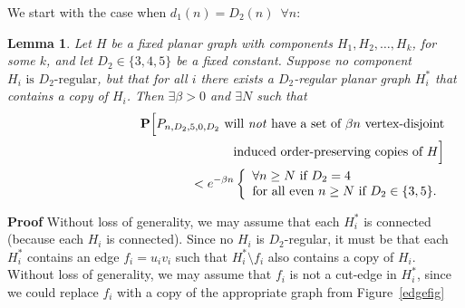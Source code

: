 \documentclass{article}
\newtheorem{Lemma}[Theorem]{Lemma}
\newtheorem{Proof of Theorem}{Proof of Theorem}
\begin{document}
We start with the case when $d_{1}(n)=D_{2}(n)$~$\forall n$:





\begin{Lemma} \label{bounded901}
Let $H$ be a fixed planar graph with components $H_{1}, H_{2}, \ldots, H_{k}$, for some $k$,
and let $D_{2} \in \{3,4,5 \}$ be a fixed constant.
Suppose no component $H_{i} \textrm{ is $D_{2}$-regular}$,
but that for all $i$ there exists a $D_{2}$-regular planar graph $H_{i}^{*}$ that contains a copy of $H_{i}$.
Then $\exists \beta > 0$ and $\exists N$ such that
\begin{eqnarray*}
& & \mathbf{P} \Big[
\textrm{$P_{n,D_{2},5,0,D_{2}}$
will \emph{not} have a set of $\beta n$ vertex-disjoint} \\
& & \phantom{wwwwwwwwwwq}\textrm{induced order-preserving copies of $H$}\Big] \\
& & \phantom{wwwwwwwwwwwwwwww}< e^{- \beta n} 
\left \{ \begin{array}{ll}
\forall n \geq N \textrm{ if } D_{2}=4 \\
\textrm{for all even } n \geq N \textrm{ if } D_{2} \in \{ 3,5 \}.
\end{array} \right.
\end{eqnarray*}
\end{Lemma}
\textbf{Proof}
Without loss of generality,
we may assume that each $H_{i}^{*}$ is connected
(because each $H_{i}$ is connected).
Since no $H_{i}$ is $D_{2}$-regular,
it must be that each~$H_{i}^{*}$ contains an edge $f_{i}=u_{i}v_{i}$
such that $H_{i}^{*} \setminus f_{i}$ also contains a copy of $H_{i}$.
Without loss of generality,
we may assume that $f_{i}$ is not a cut-edge in $H_{i}^{*}$,
since we could replace $f_{i}$ with a copy of the appropriate graph from Figure~\ref{edgefig}
\end{document}
